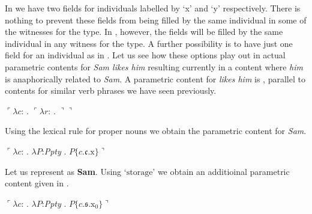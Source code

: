 In  we have two fields for individuals labelled by `x' and
`y' respectively.  There is nothing to prevent these fields from being
filled by the same individual in some of the witnesses for the type.
In , however, the fields will be filled by the same
individual in any witness for the type.  A further possibility is to
have just one field for an individual as in . Let us see how
these options play out in actual parametric contents for \textit{Sam
  likes him} resulting currently in a content where \textit{him} is
anaphorically related to \textit{Sam}.  A parametric content for
\textit{likes him} is \nexteg{}, parallel to contents for similar verb
phrases we have seen previously.
\begin{ex} 
  $\ulcorner\lambda c$: . $\ulcorner\lambda
  r$: . $\urcorner\urcorner$
  \label{ex:likes-him}
\end{ex} 
Using the lexical rule for proper nouns we obtain the parametric
content \nexteg{} for \textit{Sam}.
\begin{ex} 
  $\ulcorner\lambda c$: . $\lambda
  P$:\textit{Ppty} . $P\{c.\mathfrak{c}.\text{x}\}\urcorner$
\end{ex} 
Let us represent \preveg{} as \textbf{Sam}.  Using
`$\mathrm{storage}$' we obtain an additioinal parametric content given
in \nexteg{}.
\begin{ex} 
  $\ulcorner\lambda c$: . $\lambda
  P$:\textit{Ppty} . $P\{c.\mathfrak{s}.\text{x}_0\}\urcorner$
\end{ex} 
